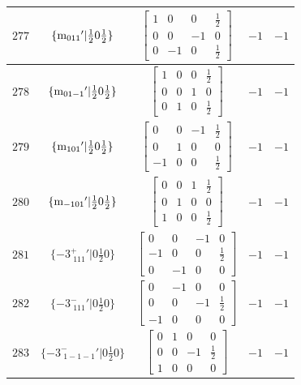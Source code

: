 \documentclass[fleqn,8pt]{jsarticle}
\begin{document}
\begin{longtable}{ccccc}
$ 277 $ & $ \{{\rm m}_{011}{}'|\frac{1}{2} 0 \frac{1}{2}\} $ & $ \begin{bmatrix} 1 & 0 & 0 & \frac{1}{2} \\ 0 & 0 & -1 & 0 \\ 0 & -1 & 0 & \frac{1}{2} \end{bmatrix} $ & $ -1 $ & $ -1 $ \\ \hline
$ 278 $ & $ \{{\rm m}_{01-1}{}'|\frac{1}{2} 0 \frac{1}{2}\} $ & $ \begin{bmatrix} 1 & 0 & 0 & \frac{1}{2} \\ 0 & 0 & 1 & 0 \\ 0 & 1 & 0 & \frac{1}{2} \end{bmatrix} $ & $ -1 $ & $ -1 $ \\ \hline
$ 279 $ & $ \{{\rm m}_{101}{}'|\frac{1}{2} 0 \frac{1}{2}\} $ & $ \begin{bmatrix} 0 & 0 & -1 & \frac{1}{2} \\ 0 & 1 & 0 & 0 \\ -1 & 0 & 0 & \frac{1}{2} \end{bmatrix} $ & $ -1 $ & $ -1 $ \\ \hline
$ 280 $ & $ \{{\rm m}_{-101}{}'|\frac{1}{2} 0 \frac{1}{2}\} $ & $ \begin{bmatrix} 0 & 0 & 1 & \frac{1}{2} \\ 0 & 1 & 0 & 0 \\ 1 & 0 & 0 & \frac{1}{2} \end{bmatrix} $ & $ -1 $ & $ -1 $ \\ \hline
$ 281 $ & $ \{-3^{+}_{\,\,111}{}'|0 \frac{1}{2} 0\} $ & $ \begin{bmatrix} 0 & 0 & -1 & 0 \\ -1 & 0 & 0 & \frac{1}{2} \\ 0 & -1 & 0 & 0 \end{bmatrix} $ & $ -1 $ & $ -1 $ \\ \hline
$ 282 $ & $ \{-3^{-}_{\,\,111}{}'|0 \frac{1}{2} 0\} $ & $ \begin{bmatrix} 0 & -1 & 0 & 0 \\ 0 & 0 & -1 & \frac{1}{2} \\ -1 & 0 & 0 & 0 \end{bmatrix} $ & $ -1 $ & $ -1 $ \\ \hline
$ 283 $ & $ \{-3^{-}_{\,\,1-1-1}{}'|0 \frac{1}{2} 0\} $ & $ \begin{bmatrix} 0 & 1 & 0 & 0 \\ 0 & 0 & -1 & \frac{1}{2} \\ 1 & 0 & 0 & 0 \end{bmatrix} $ & $ -1 $ & $ -1 $ \\ \hline

\end{longtable}
\end{document}
